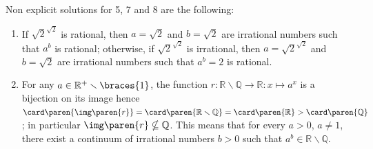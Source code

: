 Non explicit solutions for 5, 7 and 8 are the following:
\begin{enumerate}
 \item[7.]
    If $\sqrt{2}^{\sqrt{2}}$ is rational,
    then $a = \sqrt{2}$ and $b = \sqrt{2}$
    are irrational numbers such that $a^b$ is rational;
    otherwise, if $\sqrt{2}^{\sqrt{2}}$ is irrational,
    then $a = \sqrt{2}^{\sqrt{2}}$ and $b = \sqrt{2}$
    are irrational numbers such that $a^b = 2$ is rational.
\item[5, 8.]
    For any $a \in \mathbb{R}^{+} \smallsetminus \braces{1}$,
    the function $r: \mathbb{R} \smallsetminus \mathbb{Q} \to \mathbb{R} : x \mapsto a^x$
    is a bijection on its image
    hence $\card\paren{\img\paren{r}}
           = \card\paren{\mathbb{R} \smallsetminus \mathbb{Q}}
           = \card\paren{\mathbb{R}}
           > \card\paren{\mathbb{Q}}$;
    in particular $\img\paren{r} \nsubseteq \mathbb{Q}$.
    This means that for every $a > 0$, $a \neq 1$,
    there exist a continuum of irrational numbers $b > 0$
    such that $a^b \in \mathbb{R} \smallsetminus \mathbb{Q}$.
\end{enumerate}
